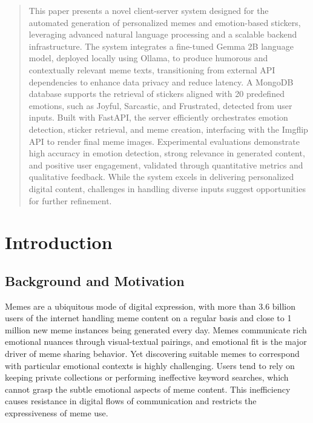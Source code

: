 \documentclass[conference]{IEEEtran}
\begin{document}
\maketitle

\begin{abstract}
This paper presents a novel client-server system designed for the automated generation of personalized memes and emotion-based stickers, leveraging advanced natural language processing and a scalable backend infrastructure. The system integrates a fine-tuned Gemma 2B language model, deployed locally using Ollama, to produce humorous and contextually relevant meme texts, transitioning from external API dependencies to enhance data privacy and reduce latency. A MongoDB database supports the retrieval of stickers aligned with 20 predefined emotions, such as Joyful, Sarcastic, and Frustrated, detected from user inputs. Built with FastAPI, the server efficiently orchestrates emotion detection, sticker retrieval, and meme creation, interfacing with the Imgflip API to render final meme images. Experimental evaluations demonstrate high accuracy in emotion detection, strong relevance in generated content, and positive user engagement, validated through quantitative metrics and qualitative feedback. While the system excels in delivering personalized digital content, challenges in handling diverse inputs suggest opportunities for further refinement.
\end{abstract}


\section{Introduction}

\subsection{Background and Motivation}
Memes are a ubiquitous mode of digital expression, with more than 3.6 billion users of the internet handling meme content on a regular basis and close to 1 million new meme instances being generated every day. Memes communicate rich emotional nuances through visual-textual pairings, and emotional fit is the major driver of meme sharing behavior. Yet discovering suitable memes to correspond with particular emotional contexts is highly challenging. Users tend to rely on keeping private collections or performing ineffective keyword searches, which cannot grasp the subtle emotional aspects of meme content. This inefficiency causes resistance in digital flows of communication and restricts the expressiveness of meme use.
\end{document}

